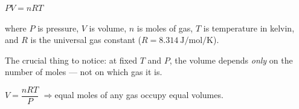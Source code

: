\documentclass[12pt, a4paper]{book}
\theoremstyle{definition}
\begin{document}
\begin{center}
\begin{tcolorbox}[
  enhanced, colback=ModuleColor!6, colframe=ModuleColor,
  width=0.6\textwidth, arc=3pt, halign=center
]
\Large
$PV = nRT$
\end{tcolorbox}
\end{center}

where $P$ is pressure, $V$ is volume, $n$ is moles of gas,
$T$ is temperature in kelvin, and $R$ is the universal gas constant
($R = \SI{8.314}{\joule\per\mol\per\kelvin}$).

The crucial thing to notice: at fixed $T$ and $P$,
the volume depends \emph{only} on the number of moles ---
not on which gas it is.

\begin{center}
\large $V = \dfrac{nRT}{P}$\quad
$\Rightarrow$\quad equal moles of any gas occupy equal volumes.
\end{center}
\end{document}
